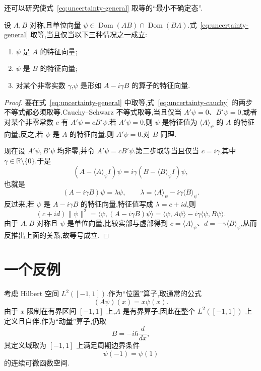 还可以研究使式~\eqref{eq:uncertainty-general} 取等的“最小不确定态”.

\begin{proposition}[最小不确定态的特征]\label{prop:minimum-uncertainty-general}
设 $A,B$ 对称,且单位向量 $\psi\in\operatorname{Dom}(AB)\cap\operatorname{Dom}(BA)$.式~\eqref{eq:uncertainty-general} 取等,当且仅当以下三种情况之一成立:
\begin{enumerate}
\item $\psi$ 是 $A$ 的特征向量;
\item $\psi$ 是 $B$ 的特征向量;
\item 对某个非零实数 $\gamma$,$\psi$ 是形如 $A-i\gamma B$ 的算子的特征向量.
\end{enumerate}
\end{proposition}

\begin{proof}
要在式~\eqref{eq:uncertainty-general} 中取等,式~\eqref{eq:uncertainty-cauchy} 的两步不等式都必须取等.Cauchy--Schwarz 不等式取等,当且仅当 $A'\psi=0$、$B'\psi=0$,或者对某个非零常数 $c$ 有 $A'\psi=cB'\psi$.若 $A'\psi=0$,则 $\psi$ 是特征值为 $\langle A\rangle_\psi$ 的 $A$ 的特征向量;反之,若 $\psi$ 是 $A$ 的特征向量,则 $A'\psi=0$.对 $B$ 同理.

现在设 $A'\psi,B'\psi$ 均非零,并令 $A'\psi=cB'\psi$.第二步取等当且仅当 $c=i\gamma$,其中 $\gamma\in\mathbb R\setminus\{0\}$.于是
\[
(A-\langle A\rangle_\psi I)\psi
=i\gamma(B-\langle B\rangle_\psi I)\psi,
\]
也就是
\[
(A-i\gamma B)\psi=\lambda\psi,
\qquad
\lambda=\langle A\rangle_\psi-i\gamma\langle B\rangle_\psi.
\]
反过来,若 $\psi$ 是 $A-i\gamma B$ 的特征向量,特征值写成 $\lambda=c+id$,则
\[
(c+id)\|\psi\|^2
=\langle\psi,(A-i\gamma B)\psi\rangle
=\langle\psi,A\psi\rangle-i\gamma\langle\psi,B\psi\rangle.
\]
由于 $A,B$ 对称且 $\psi$ 是单位向量,比较实部与虚部得到 $c=\langle A\rangle_\psi$、$d=-\gamma\langle B\rangle_\psi$,从而反推出上面的关系,故等号成立.
\end{proof}

\section{一个反例}
\label{sec:uncertainty-counterexample}

考虑 Hilbert 空间 $L^2([-1,1])$.作为“位置”算子,取通常的公式
\[
(A\psi)(x)=x\psi(x).
\]
由于 $x$ 限制在有界区间 $[-1,1]$ 上,$A$ 是有界算子,因此在整个 $L^2([-1,1])$ 上定义且自伴.作为“动量”算子,仍取
\[
B=-i\hbar\frac{d}{dx},
\]
其定义域取为 $[-1,1]$ 上满足周期边界条件
\[
\psi(-1)=\psi(1)
\label{eq:periodic-boundary}
\]
的连续可微函数空间.

